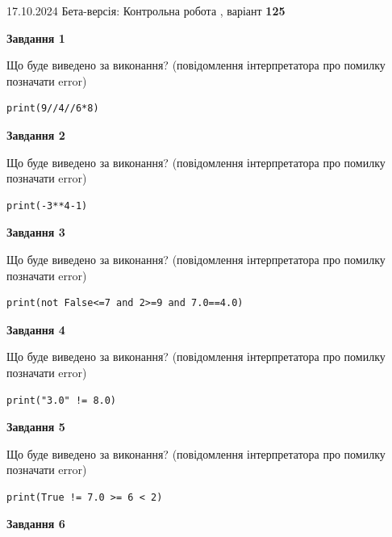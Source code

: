 \documentclass[12pt, ukrainian]{article}
\begin{document}
{\Large{17.10.2024 Бета-версія: Контрольна робота , варіант  \No \textbf { 125 }\par}}
{
\begin {large}
{\begin {center}\textbf{Завдання 1}\end {center}}

Що буде виведено за виконання? (повідомлення інтерпретатора про помилку позначати error)\par
\begin{verbatim}
print(9//4//6*8)
\end{verbatim}

{\begin {center}\textbf{Завдання 2}\end {center}}

Що буде виведено за виконання? (повідомлення інтерпретатора про помилку позначати error)\par
\begin{verbatim}
print(-3**4-1)
\end{verbatim}

{\begin {center}\textbf{Завдання 3}\end {center}}

Що буде виведено за виконання? (повідомлення інтерпретатора про помилку позначати error)\par
\begin{verbatim}
print(not False<=7 and 2>=9 and 7.0==4.0)
\end{verbatim}

{\begin {center}\textbf{Завдання 4}\end {center}}

Що буде виведено за виконання? (повідомлення інтерпретатора про помилку позначати error)\par
\begin{verbatim}
print("3.0" != 8.0)
\end{verbatim}

{\begin {center}\textbf{Завдання 5}\end {center}}

Що буде виведено за виконання? (повідомлення інтерпретатора про помилку позначати error)\par
\begin{verbatim}
print(True != 7.0 >= 6 < 2)
\end{verbatim}

{\begin {center}\textbf{Завдання 6}\end {center}}


\end{large}}
\end{document}

